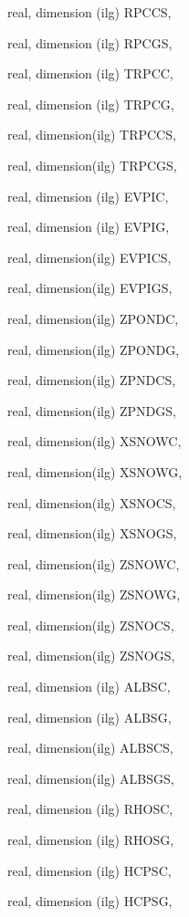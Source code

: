 {\begin{DoxyParamCaption}
\item[{real, dimension (ilg)}]{R\+P\+C\+C\+S, }
\item[{real, dimension (ilg)}]{R\+P\+C\+G\+S, }
\item[{real, dimension (ilg)}]{T\+R\+P\+C\+C, }
\item[{real, dimension (ilg)}]{T\+R\+P\+C\+G, }
\item[{real, dimension(ilg)}]{T\+R\+P\+C\+C\+S, }
\item[{real, dimension(ilg)}]{T\+R\+P\+C\+G\+S, }
\item[{real, dimension (ilg)}]{E\+V\+P\+I\+C, }
\item[{real, dimension (ilg)}]{E\+V\+P\+I\+G, }
\item[{real, dimension(ilg)}]{E\+V\+P\+I\+C\+S, }
\item[{real, dimension(ilg)}]{E\+V\+P\+I\+G\+S, }
\item[{real, dimension(ilg)}]{Z\+P\+O\+N\+D\+C, }
\item[{real, dimension(ilg)}]{Z\+P\+O\+N\+D\+G, }
\item[{real, dimension(ilg)}]{Z\+P\+N\+D\+C\+S, }
\item[{real, dimension(ilg)}]{Z\+P\+N\+D\+G\+S, }
\item[{real, dimension(ilg)}]{X\+S\+N\+O\+W\+C, }
\item[{real, dimension(ilg)}]{X\+S\+N\+O\+W\+G, }
\item[{real, dimension(ilg)}]{X\+S\+N\+O\+C\+S, }
\item[{real, dimension(ilg)}]{X\+S\+N\+O\+G\+S, }
\item[{real, dimension(ilg)}]{Z\+S\+N\+O\+W\+C, }
\item[{real, dimension(ilg)}]{Z\+S\+N\+O\+W\+G, }
\item[{real, dimension(ilg)}]{Z\+S\+N\+O\+C\+S, }
\item[{real, dimension(ilg)}]{Z\+S\+N\+O\+G\+S, }
\item[{real, dimension (ilg)}]{A\+L\+B\+S\+C, }
\item[{real, dimension (ilg)}]{A\+L\+B\+S\+G, }
\item[{real, dimension(ilg)}]{A\+L\+B\+S\+C\+S, }
\item[{real, dimension(ilg)}]{A\+L\+B\+S\+G\+S, }
\item[{real, dimension (ilg)}]{R\+H\+O\+S\+C, }
\item[{real, dimension (ilg)}]{R\+H\+O\+S\+G, }
\item[{real, dimension (ilg)}]{H\+C\+P\+S\+C, }
\item[{real, dimension (ilg)}]{H\+C\+P\+S\+G, }

\end{DoxyParamCaption}}
